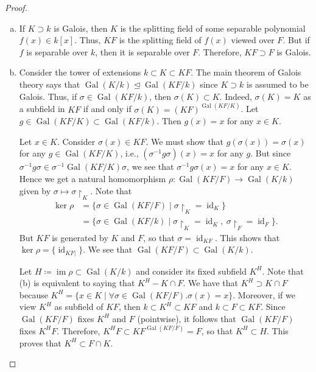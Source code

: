 \documentclass[10pt,letterpaper,cm]{nupset}
\theoremstyle{definition}
\newcommand{\1}{\mathbf{1}}
\newcommand{\0}{\vec 0}
\DeclareMathOperator{\id}{id}
\DeclareMathOperator{\gal}{Gal}
\DeclareMathOperator{\im}{im}
\begin{document}
\begin{proof} $ $
\begin{enumerate}[(a)]
\item  If $K\supset k$ is Galois, then $K$ is the splitting field of some separable polynomial $f(x) \in k[x]$. Thus, $KF$ is the splitting field of $f(x)$ viewed over $F$. But if $f$ is separable over $k$, then it is separable over $F$. Therefore, $KF \supset F$ is Galois.
\item Consider the tower of extensions $k \subset K \subset KF$. The main theorem of Galois theory says that $\gal(K/k) \unlhd \gal(KF/k)$ since $K\supset k$ is assumed to be Galois. Thus, if $\sigma \in \gal(KF/k)$, then $\sigma(K) \subset K$. Indeed, $\sigma(K) = K$ as a subfield in $KF$ if and only if $\sigma(K) = (KF)^{\gal(KF/K)}$. Let $g\in \gal(KF/K) \subset \gal(KF/k)$. Then $g(x) = x$ for any $x\in K$. 

Let $x\in K$. Consider $\sigma(x) \in KF$.  We must show that $g(\sigma(x)) = \sigma(x)$ for any $g \in \gal(KF/K)$, i.e., $(\sigma^{-1}{g}{\sigma})(x) = x$ for any $g$. But since $\sigma^{-1}{g}{\sigma} \in \sigma^{-1}{\gal(KF/K)}{\sigma}$, we see that $\sigma^{-1}{g}{\sigma}(x) = x$ for any $x\in K$. Hence we get a natural homomorphism $ \rho : \gal(KF/F) \to \gal(K/k)$ given by $\sigma \mapsto \sigma \restriction_K$.  Note that \begin{align*} \ker{\rho} & = \{\sigma \in \gal(KF/F) \mid \sigma \restriction_K = \id_K\}
\\ & = \{\sigma \in \gal(KF/k) \mid \sigma \restriction_K = \id_K, \ \sigma \restriction_F = \id_F\}.
\end{align*}  But $KF$ is generated by $K$ and $F$, so that $\sigma = \id_{KF}$. This shows that $\ker{\rho} = \{\id_{KF|}\}$. We see that $\gal(KF/F) \subset \gal(K/k)$. 

Let $H \coloneqq  \im{\rho} \subset \gal(K/k)$ and consider its fixed subfield $K^H$. Note that (b) is equivalent to saying that $K^H - K \cap F$. We have that $K^H \supset K \cap F$ because $K^H = \{x\in K \mid \forall \sigma \in \gal(KF/F).\sigma(x) =x\}$. Moreover, if we view $K^H$ as subfield of $KF$, then $k \subset K^H \subset KF$ and $k \subset F \subset KF$.  Since $\gal(KF/F)$ fixes $K^H$ and $F$ (pointwise), it follows that $\gal(KF/F)$ fixes $K^HF$. Therefore, $K^HF \subset KF^{\gal(KF/F)} = F$, so that $K^H \subset H$. This proves that $K^H \subset F \cap K$. 
\end{enumerate}
\end{proof}
\end{document}
